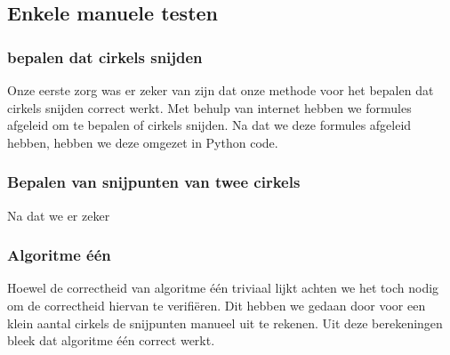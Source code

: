 \documentclass[11pt,a4paper]{article}
\begin{document}
\subsection{Enkele manuele testen}

\subsubsection*{bepalen dat cirkels snijden}
Onze eerste zorg was er zeker van zijn dat onze methode voor het bepalen dat cirkels snijden correct werkt. Met behulp van internet hebben we formules afgeleid om te bepalen of cirkels snijden. Na dat we deze formules afgeleid hebben, hebben we deze omgezet in Python code.

\subsubsection*{Bepalen van snijpunten van twee cirkels}
Na dat we er zeker 

\subsubsection*{Algoritme \'e\'en}
Hoewel de correctheid van algoritme \'e\'en triviaal lijkt achten we het toch nodig om de correctheid hiervan te verifi\"eren. Dit hebben we gedaan door voor een klein aantal cirkels de snijpunten manueel uit te rekenen. Uit deze berekeningen bleek dat algoritme \'e\'en correct werkt.
\end{document}
